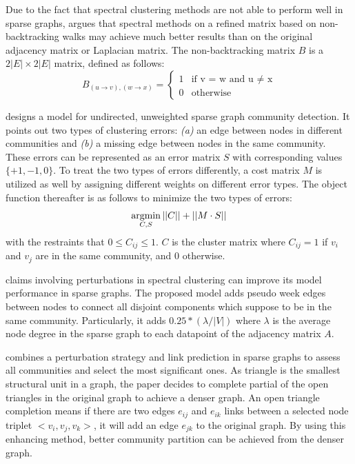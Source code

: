 Due to the fact that spectral clustering methods are not able to perform well in sparse graphs, \cite{krzakala2013spectral} argues that spectral methods on a refined matrix based on non-backtracking walks may achieve much better results than on the original adjacency matrix or Laplacian matrix.  The non-backtracking matrix $B$ is a $2|E| \times 2|E|$ matrix, defined as follows:
\begin{equation}
B_{(u\rightarrow v),(w\rightarrow x)} = 
\begin{cases}
1& \text{if v = w and u  $\neq$ x}\\
0& \text{otherwise}
\end{cases}
\end{equation}

\cite{chen2012clustering} designs a model for undirected, unweighted sparse graph community detection. It points out two types of clustering errors: \textit{(a)} an edge between nodes in different communities and \textit{(b)} a missing edge between nodes in the same community. These errors can be represented as an error matrix $S$ with corresponding values $\{+1,-1,0\}$. To treat the two types of errors differently, a cost matrix $M$ is utilized as well by assigning different weights on different error types. The object function thereafter is as follows to minimize the two types of errors:
\begin{equation}
	\operatorname*{argmin}_{C,S} ||C|| + ||M \cdot S||
\end{equation}
with the restraints that $0 \leq C_{ij} \leq 1$. $C$ is the cluster matrix where $C_{ij} = 1$ if $v_i$ and $v_j$ are in the same community, and 0 otherwise. 

\cite{amini2013pseudo} claims involving perturbations in spectral clustering can improve its model performance in sparse graphs. The proposed model adds pseudo week edges between nodes to connect all disjoint components which suppose to be in the same community.  Particularly, it adds $0.25*(\lambda /|V|)$ where $\lambda$ is the average node degree in the sparse graph to each datapoint of the adjacency matrix $A$.

\cite{mirshahvalad2012significant} combines a perturbation strategy and link prediction in sparse graphs to assess all communities and select the most significant ones. As triangle is the smallest structural unit in a graph, the paper decides to complete partial of the open triangles in the original graph to achieve a denser graph. An open triangle completion means if there are two edges $e_{ij}$ and $e_{ik}$ links between a selected node triplet $<v_i,v_j,v_k>$, it will add an edge $e_{jk}$ to the original graph. By using this enhancing method, better community partition can be achieved from the denser graph. 

